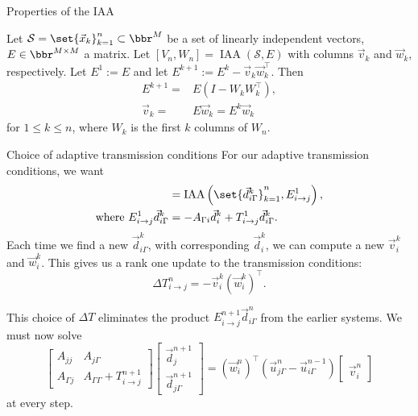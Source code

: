 \documentclass{beamer}
\DeclareMathOperator{\iaa}{IAA} %
\begin{document}
\begin{frame}{Properties of the IAA}
\begin{lemma} \label{lem: iaa}
	Let $\mathcal{S}=\set{\vec{x}_k}_{k=1}^n \subset \bbr^M$ be a set of linearly independent vectors, $E \in \bbr^{M \times M}$ a matrix.
	Let $[V_n,W_n]=\iaa(\mathcal{S},E)$ with columns $\vec{v}_k$ and $\vec{w}_k$, respectively.
	Let $E^1 := E$ and let $E^{k+1} := E^k - \vec{v}_k \vec{w}_k^\top$.
	Then
	\begin{align*}
		E^{k+1} = & E (I - W_k W_k^\top), \\
		\vec{v}_k = & E \vec{w}_k = E^k \vec{w}_k
	\end{align*}
	for $1 \leq k \leq n$, where $W_k$ is the first $k$ columns of $W_n$.
\end{lemma}
\end{frame}

\begin{frame}{Choice of adaptive transmission conditions}
For our adaptive transmission conditions, we want
\begin{align*}
	[ V_i^n, W_i^n ] & = \iaa \left ( \set{ \vec{d}_{i \Gamma}^k }_{k=1}^n, E_{i \to j}^1 \right ), \\
	\text{where} \ E_{i \to j}^1 \vec{d}_{i \Gamma}^k & = -A_{\Gamma i} \vec{d}_i^k + T_{i \to j}^1 \vec{d}_{i \Gamma}^k.
\end{align*}
Each time we find a new $\vec{d}_{i \Gamma}^k$, with corresponding $\vec{d}_i^k$, we can compute a new $\vec{v}_i^k$ and $\vec{w}_i^k$.
This gives us a rank one update to the transmission conditions:
\begin{equation*}
	\Delta T_{i \to j}^n = - \vec{v}_i^k \left ( \vec{w}_i^k \right )^\top.
\end{equation*}

This choice of $\Delta T$ eliminates the product $E_{i \to j}^{n+1} \vec{d}_{i \Gamma}^n$ from the earlier systems.
We must now solve
\begin{equation*}
	\begin{bmatrix} A_{jj} & A_{j \Gamma} \\ A_{\Gamma j} & A_{\Gamma \Gamma} + T_{i \to j}^{n+1} \end{bmatrix}
	\begin{bmatrix} \vec{d}_j^{n+1} \\ \vec{d}_{j \Gamma}^{n+1} \end{bmatrix}
	= (\vec{w}_i^n)^\top \left ( \vec{u}_{j \Gamma}^n - \vec{u}_{i \Gamma}^{n-1} \right )\begin{bmatrix} ~ \\ \vec{v}_i^n \end{bmatrix}
\end{equation*}
at every step.
\end{frame}
\end{document}
